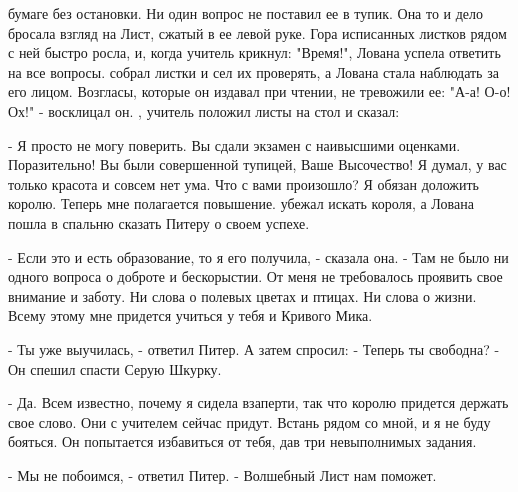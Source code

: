 бумаге без остановки. Ни один вопрос не поставил ее в тупик. Она то и 
дело бросала взгляд на Лист, сжатый в ее левой руке. Гора исписанных 
листков рядом с ней быстро росла, и, когда учитель крикнул: "Время!", 
Лована успела ответить на все вопросы.
 собрал листки и сел их проверять, а Лована стала наблюдать 
за его лицом. Возгласы, которые он издавал при чтении, не тревожили 
ее: "А-а! О-о! Ох!" - восклицал он.
, учитель положил листы на стол и сказал:
\par- Я просто не могу поверить. Вы сдали экзамен с наивысшими 
оценками. Поразительно! Вы были совершенной тупицей, Ваше Высочество! 
Я думал, у вас только красота и совсем нет ума. Что с вами произошло? 
Я обязан доложить королю. Теперь мне полагается повышение.
 убежал искать короля, а Лована пошла в спальню сказать Питеру о 
своем успехе.
\par- Если это и есть образование, то я его получила, - сказала она. - 
Там не было ни одного вопроса о доброте и бескорыстии. От меня не 
требовалось проявить свое внимание и заботу. Ни слова о полевых цветах 
и птицах. Ни слова о жизни. Всему этому мне придется учиться у тебя и 
Кривого Мика.
\par- Ты уже выучилась, - ответил Питер. А затем спросил: - Теперь ты 
свободна? - Он спешил спасти Серую Шкурку.
\par- Да. Всем известно, почему я сидела взаперти, так что королю 
придется держать свое слово. Они с учителем сейчас придут. Встань 
рядом со мной, и я не буду бояться. Он попытается избавиться от тебя, 
дав три невыполнимых задания.
\par- Мы не побоимся, - ответил Питер. - Волшебный Лист нам поможет.
